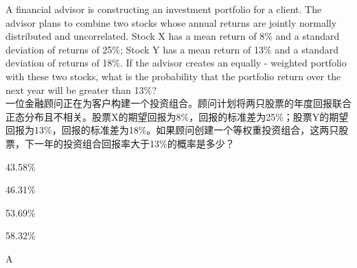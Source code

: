 \documentclass{article}
\newcounter{question} %
\begin{document}
    \begin{question}
        A financial advisor is constructing an investment portfolio for a client. The advisor plans to combine two stocks whose annual returns are jointly normally distributed and uncorrelated. Stock X has a mean return of 8\% and a standard deviation of returns of 25\%; Stock Y has a mean return of 13\% and a standard deviation of returns of 18\%. If the advisor creates an equally - weighted portfolio with these two stocks, what is the probability that the portfolio return over the next year will be greater than 13\%?\\
        一位金融顾问正在为客户构建一个投资组合。顾问计划将两只股票的年度回报联合正态分布且不相关。股票X的期望回报为8\%，回报的标准差为25\%；股票Y的期望回报为13\%，回报的标准差为18\%。如果顾问创建一个等权重投资组合，这两只股票，下一年的投资组合回报率大于13\%的概率是多少？
        \end{question}
        
        \begin{choices}
            \item 43.58\%
            \item 46.31\%
            \item 53.69\%
            \item 58.32\%
        \end{choices}
        
        \begin{correctanswer}
            A
        \end{correctanswer}
        
\end{document}
